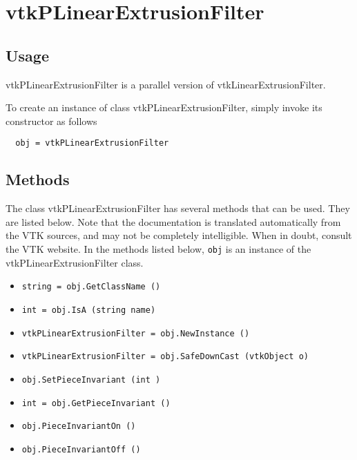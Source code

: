 \section{vtkPLinearExtrusionFilter}

\subsection{Usage}

 vtkPLinearExtrusionFilter is a parallel version of vtkLinearExtrusionFilter.

To create an instance of class vtkPLinearExtrusionFilter, simply
invoke its constructor as follows
\begin{verbatim}
  obj = vtkPLinearExtrusionFilter
\end{verbatim}
\subsection{Methods}

The class vtkPLinearExtrusionFilter has several methods that can be used.
  They are listed below.
Note that the documentation is translated automatically from the VTK sources,
and may not be completely intelligible.  When in doubt, consult the VTK website.
In the methods listed below, \verb|obj| is an instance of the vtkPLinearExtrusionFilter class.
\begin{itemize}
\item  \verb|string = obj.GetClassName ()|

\item  \verb|int = obj.IsA (string name)|

\item  \verb|vtkPLinearExtrusionFilter = obj.NewInstance ()|

\item  \verb|vtkPLinearExtrusionFilter = obj.SafeDownCast (vtkObject o)|

\item  \verb|obj.SetPieceInvariant (int )|

\item  \verb|int = obj.GetPieceInvariant ()|

\item  \verb|obj.PieceInvariantOn ()|

\item  \verb|obj.PieceInvariantOff ()|

\end{itemize}

